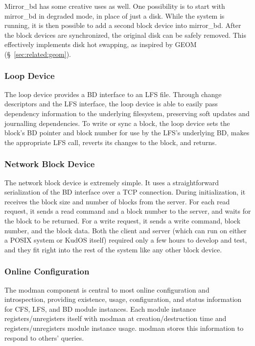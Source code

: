 Mirror\_bd has some creative uses as well. One possibility is to start with
mirror\_bd in degraded mode, in place of just a disk. While the system is
running, it is then possible to add a second block device into mirror\_bd.
After the block devices are synchronized, the original disk can be safely
removed. This effectively implements disk hot swapping, as inspired by GEOM
(\S~\ref{sec:related:geom}).

\subsubsection{Loop Device}
\label{sec:solution:impl:loop}

The loop device provides a BD interface to an LFS file. Through change
descriptors and the LFS interface, the loop device is able to easily pass
dependency information to the underlying filesystem, preserving soft updates and
journalling dependencies. To write or sync a block, the loop device sets the
block's BD pointer and block number for use by the LFS's underlying BD, makes
the appropriate LFS call, reverts its changes to the block, and returns.

\subsubsection{Network Block Device}
\label{sec:solution:impl:nbd}

The network block device is extremely simple. It uses a straightforward
serialization of the BD interface over a TCP connection. During initialization,
it receives the block size and number of blocks from the server. For each read
request, it sends a read command and a block number to the server, and waits for
the block to be returned. For a write request, it sends a write command, block
number, and the block data. Both the client and server (which can run on either
a POSIX system or KudOS itself) required only a few hours to develop and test,
and they fit right into the rest of the system like any other block device.

\subsubsection{Online Configuration}
\label{sec:solution:impl:online}

The modman component is central to most online configuration and introspection,
providing existence, usage, configuration, and status information for CFS, LFS,
and BD module instances. Each module instance registers/unregisters itself with
modman at creation/destruction time and registers/unregisters module instance
usage. modman stores this information to respond to others' queries.

